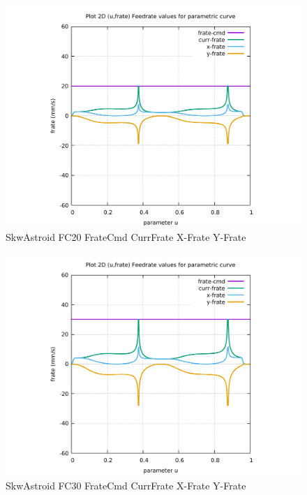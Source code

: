 \begin{figure}
	\caption     {SkwAstroid FC20 FrateCmd CurrFrate X-Frate Y-Frate}
	\label{28-img-SkwAstroid-FC20-FrateCmd-CurrFrate-X-Frate-Y-Frate.pdf}
	\includegraphics[width=1.00\textwidth]{Chap4/appendix/app-SkwAstroid/plots/28-img-SkwAstroid-FC20-FrateCmd-CurrFrate-X-Frate-Y-Frate.pdf}
\end{figure}


\clearpage
\pagebreak

\begin{figure}
	\caption     {SkwAstroid FC30 FrateCmd CurrFrate X-Frate Y-Frate}
	\label{29-img-SkwAstroid-FC30-FrateCmd-CurrFrate-X-Frate-Y-Frate.pdf}
	\includegraphics[width=1.00\textwidth]{Chap4/appendix/app-SkwAstroid/plots/29-img-SkwAstroid-FC30-FrateCmd-CurrFrate-X-Frate-Y-Frate.pdf}
\end{figure}


